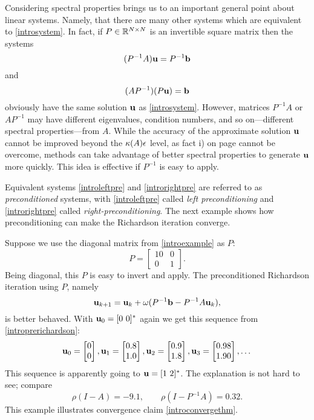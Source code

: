 Considering spectral properties brings us to an important general point about linear systems.  Namely, that there are many other systems which are equivalent to \eqref{introsystem}.  In fact, if $P\in\mathbb{R}^{N\times N}$ is an invertible square matrix then the systems
\begin{equation}
(P^{-1} A) \mathbf{u} = P^{-1} \mathbf{b} \label{introleftpre}
\end{equation}
and
\begin{equation}
(A P^{-1}) (P\mathbf{u}) = \mathbf{b} \label{introrightpre}
\end{equation}
obviously have the same solution $\mathbf{u}$ as \eqref{introsystem}.  However, matrices $P^{-1} A$ or $A P^{-1}$ may have different eigenvalues, condition numbers, and so on---different spectral properties---from $A$.  While the accuracy of the approximate solution $\mathbf{u}$ cannot be improved beyond the $\kappa(A) \epsilon$ level, as fact i) on page \pageref{limittoaccuracy} cannot be overcome, methods can take advantage of better spectral properties to generate $\mathbf{u}$ more quickly.  This idea is effective if $P^{-1}$ is easy to apply.

Equivalent systems \eqref{introleftpre} and \eqref{introrightpre} are referred to as \emph{preconditioned} systems, with \eqref{introleftpre} called \emph{left preconditioning} and \eqref{introrightpre} called \emph{right-preconditioning}.  The next example shows how preconditioning can make the Richardson iteration converge.

\medskip\noindent\hrulefill
\begin{examplecont}  Suppose we use the diagonal matrix from  \eqref{introexample} as $P$:
\begin{equation}
P = \begin{bmatrix}
10 & 0 \\ 0 & 1
\end{bmatrix}.  \label{introP}
\end{equation}
Being diagonal, this $P$ is easy to invert and apply.  The preconditioned Richardson iteration using $P$, namely
\begin{equation}
\mathbf{u}_{k+1} = \mathbf{u}_k + \omega (P^{-1} \mathbf{b} - P^{-1} A \mathbf{u}_k),  \label{introprerichardson}
\end{equation}
is better behaved.  With $\mathbf{u}_0 = [0\,\, 0]^*$ again we get this sequence from \eqref{introprerichardson}:
\begin{equation}
\mathbf{u}_{0} = \begin{bmatrix} 0 \\ 0 \end{bmatrix}, \mathbf{u}_{1} = \begin{bmatrix} 0.8 \\ 1.0 \end{bmatrix}, \mathbf{u}_{2} = \begin{bmatrix} 0.9 \\ 1.8 \end{bmatrix}, \mathbf{u}_{3} = \begin{bmatrix} 0.98 \\ 1.90 \end{bmatrix}, \dots
\end{equation}
This sequence is apparently going to $\mathbf{u} = [1\,\, 2]^*$.  The explanation is not hard to see; compare
\begin{equation}
\rho(I-A) = -9.1, \qquad \rho(I-P^{-1} A) = 0.32.
\end{equation}
This example illustrates convergence claim \eqref{introconvergethm}.
\end{examplecont}
\noindent\hrulefill

